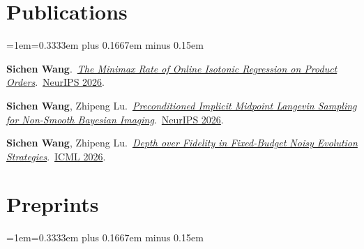 \documentclass[a4paper, 10.5pt]{ctexart}
\newlength{\pubgap}\setlength{\pubgap}{0.45em}
\newlength{\secgap}\setlength{\secgap}{0.8em}
\begin{document}
\begin{minipage}[t]{0.68\textwidth}

\section{Publications}
\begingroup
{}\relax{}\relax{}\relax\emergencystretch=1em\relax\spaceskip=0.3333em plus 0.1667em minus 0.15em\relax

\textbf{Sichen Wang}.\ \href{https://sichenwang.com/publications/online-isotonic-regression/}{\textit{The Minimax Rate of Online Isotonic Regression on Product Orders}}.\ \href{https://openreview.net/forum?id=OZYmFCFi3w}{\textcolor{VenueColor}{NeurIPS 2026}}.
\par\vspace{\pubgap}
\textbf{Sichen Wang}, Zhipeng Lu.\ \href{https://sichenwang.com/publications/implicit-midpoint-langevin/}{\textit{Preconditioned Implicit Midpoint Langevin Sampling for Non-Smooth Bayesian Imaging}}.\ \href{https://openreview.net/forum?id=6vWdtoSoVB}{\textcolor{VenueColor}{NeurIPS 2026}}.
\par\vspace{\pubgap}
\textbf{Sichen Wang}, Zhipeng Lu.\ \href{https://sichenwang.com/publications/depth-over-fidelity/}{\textit{Depth over Fidelity in Fixed-Budget Noisy Evolution Strategies}}.\ \href{https://proceedings.mlr.press/v306/wang26ff.html}{\textcolor{VenueColor}{ICML 2026}}.

\endgroup

\vspace*{\secgap}
\section{Preprints}
\begingroup
{}\relax{}\relax{}\relax\emergencystretch=1em\relax\spaceskip=0.3333em plus 0.1667em minus 0.15em\relax


\end{minipage}
\end{document}
